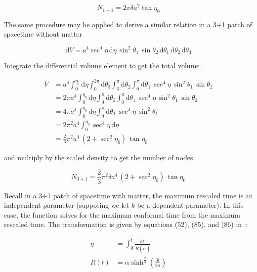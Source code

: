 \documentclass[preprint,notitlepage,amsmath,amssymb,floatfix]{revtex4-1}
\begin{document}
\begin{equation}
\label{eq:finalN1}
N_{\mathrm{1+1}} = 2\pi\delta a^2\tan\eta_0
\end{equation}

\noindent The same procedure may be applied to derive a similar relation in a 3+1 patch of spacetime without matter

\begin{equation}
\mathrm{d}V = a^4\sec^4\eta\,\mathrm{d}\eta\,\sin^2\theta_1\,\sin\theta_2\,\mathrm{d}\theta_1\,\mathrm{d}\theta_2\,\mathrm{d}\theta_3
\end{equation}

\noindent Integrate the differential volume element to get the total volume

\begin{equation}
\begin{split}
V &= a^4\int_0^{\eta_0}\!\mathrm{d}\eta\int_0^{2\pi}\!\mathrm{d}\theta_3\int_0^\pi\!\mathrm{d}\theta_2\int_0^\pi\!\mathrm{d}\theta_1\,\sec^4\eta\,\sin^2\theta_1\,\sin\theta_2 \\
  &= 2\pi a^4\int_0^{\eta_0}\!\mathrm{d}\eta\int_0^\pi\!\mathrm{d}\theta_2\int_0^\pi\!\mathrm{d}\theta_1\,\sec^4\eta\,\sin^2\theta_1\,\sin\theta_2 \\
  &= 4\pi a^4\int_0^{\eta_0}\!\mathrm{d}\eta\int_0^\pi\!\mathrm{d}\theta_1\,\sec^4\eta\,\sin^2\theta_1 \\
  &= 2\pi^2 a^4\int_0^{\eta_0}\!\sec^4\eta\,\mathrm{d}\eta \\
  &= \frac{2}{3}\pi^2 a^4\,\left(2+\sec^2\eta_0\right)\,\tan\eta_0
\end{split}
\end{equation}

\noindent and multiply by the scaled density to get the number of nodes

\begin{equation}
\label{eq:finalN3}
N_{\mathrm{3+1}} = \frac{2}{3}\pi^2\delta a^4\,\left(2+\sec^2\eta_0\right)\,\tan\eta_0
\end{equation}

\noindent Recall in a 3+1 patch of spacetime with matter, the maximum rescaled time is an independent parameter (supposing we let $\bar{k}$ be a dependent parameter).
In this case, the function solves for the maximum conformal time from the maximum rescaled time.
The transformation is given by equations (52), (85), and (86) in~\cite{ref:snc2012}:

\begin{align}
\eta &= \int_0^t\!\frac{\mathrm dt^\prime}{R\left(t^\prime\right)} \label{eq:t_to_eta} \\
R\left(t\right) &= \alpha\sinh^{\frac{2}{3}}\left(\frac{3t}{2a}\right) \label{eq:scale_factor}
\end{align}
\end{document}
